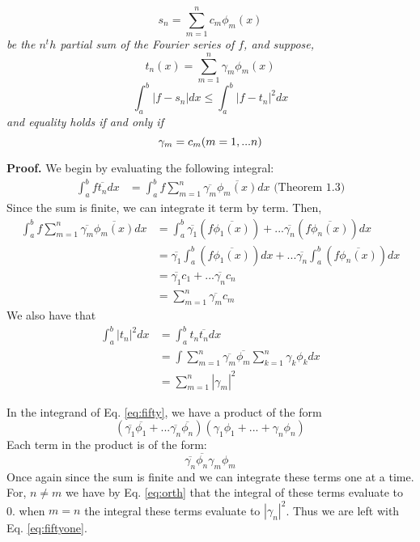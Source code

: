 \documentclass{article}
\begin{document}
\begin{equation}
s_n=\sum_{m=1}^{n} c_m\phi_m(x) 
\end{equation}
\emph{
be the $n^th$ partial sum of the Fourier series of $f$, and suppose,}
\begin{equation}
t_n(x) = \sum^n_{m=1} \gamma_m \phi_m(x)
\end{equation}
\begin{equation}
\int_a^b |f-s_n|dx \leq \int_a^b |f-t_n|^2 dx
\end{equation}
\emph{and equality holds if and only if}
\begin{equation}
\gamma_m=c_m\text(m=1,...n)
\end{equation}


\textbf{Proof.}
We begin by evaluating the following integral:
\begin{align}
\int_a^b f \overline{t_n}dx&= \int_a^b f \sum_{m=1}^n\overline{\gamma_m}\overline{\phi_m(x)} dx \text{ (Theorem 1.3)}
\end{align}
Since the sum is finite, we can integrate it term by term.  Then,
\begin{align}
\int_a^b f \sum_{m=1}^n\overline{\gamma_m}\overline{\phi_m(x)} dx &=\int_a^b \overline{\gamma_1}(f\overline{\phi_1(x)})+... \overline{\gamma_n}(f\overline{\phi_n(x)}) dx\\
&=\overline{\gamma_1}\int_a^b (f\overline{\phi_1(x)})dx+... \overline{\gamma_n}\int_a^b(f\overline{\phi_n(x)}) dx\\
&=  \overline{\gamma_1}c_1+...  \overline{\gamma_n}c_n\\
&=\sum_{m=1}^n \overline{\gamma_m }c_m
\end{align}
We also have that 
\begin{align}
\int_a^b|t_n|^2 dx &= \int_a^b t_n\overline{t_n} dx \\
\label{eq:fifty}
                    &= \int  \sum_{m=1}^n \overline{\gamma_m}\overline{\phi_m} \sum_{k=1}^n\gamma_k\phi_k dx\\ 
                \label{eq:fiftyone}    
                    &=\sum_{m=1}^n |\gamma_m|^2 
\end{align}

In the integrand of Eq. \ref{eq:fifty}, we have a product of the form $$(\overline{\gamma_1}\overline{\phi_1}+...\overline{\gamma_n}\overline{\phi_n})(\gamma_1\phi_1+...+\gamma_n\phi_n)$$  Each term in the product is of the form: $$\overline{\gamma_n}\overline{\phi_n}\gamma_m\phi_m$$  Once again since the sum is finite and we can integrate these terms one at a time.  For, $n\neq m$ we have by Eq. \ref{eq:orth} that the integral of these terms evaluate to 0.  when $m=n$ the integral these terms evaluate to $|\gamma_n|^2$. Thus we are left with  Eq. \ref{eq:fiftyone}.
\end{document}
